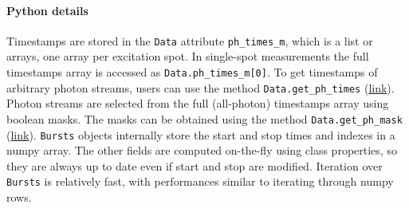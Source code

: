\paragraph{Python details}
Timestamps are stored in the \verb|Data| attribute \verb|ph_times_m|, which is a list
or arrays, one array per excitation spot. In single-spot measurements the full
timestamps array is accessed as \verb|Data.ph_times_m[0]|. To get  timestamps
of arbitrary photon streams, users can use the method \verb|Data.get_ph_times|
(\href{http://fretbursts.readthedocs.org/en/latest/data_class.html?highlight=get_ph_times#fretbursts.burstlib.Data.get_ph_times}{link}).
Photon streams are selected from the full (all-photon) timestamps array using
boolean masks. The masks can be obtained using the method \verb|Data.get_ph_mask|
(\href{http://fretbursts.readthedocs.org/en/latest/data_class.html?highlight=get_ph_mask#fretbursts.burstlib.Data.get_ph_mask}{link}).
\verb|Bursts| objects 
internally store the start and stop times and indexes in a numpy array.
The other fields are computed on-the-fly using class properties, so they are always
up to date even if start and stop are modified. Iteration over \verb|Bursts| is
relatively fast, with performances similar to iterating through numpy rows.

